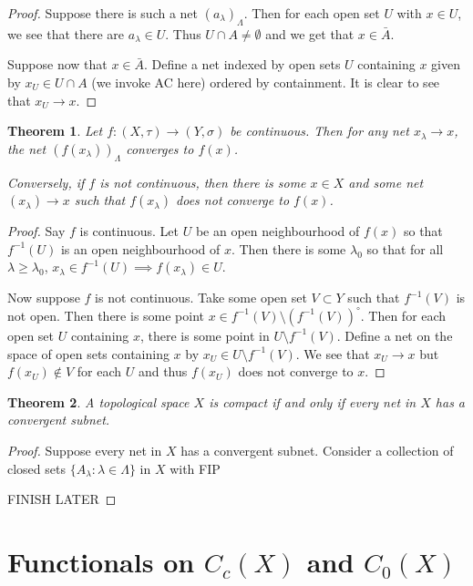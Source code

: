 \documentclass[11pt]{amsart}
\newtheorem{theorem}{Theorem}[section]
\theoremstyle{definition}
\numberwithin{equation}{section}
\begin{document}
\begin{proof}
    Suppose there is such a net $(a_\lambda)_\Lambda$. Then for each open set $U$ with $x\in U$, we see that there are $a_\lambda\in U$. Thus $U\cap A\ne\emptyset$ and we get that $x\in \bar A$.

    Suppose now that $x\in\bar A$. Define a net indexed by open sets $U$ containing $x$ given by $x_U\in U\cap A$ (we invoke AC here) ordered by containment. It is clear to see that $x_U\to x$.
\end{proof}
\begin{theorem}
    Let $f:(X,\tau)\to(Y,\sigma)$ be continuous. Then for any net $x_\lambda\to x$, the net $(f(x_\lambda))_\Lambda$ converges to $f(x)$.

    Conversely, if $f$ is not continuous, then there is some $x\in X$ and some net $(x_\lambda)\to x$ such that $f(x_\lambda)$ does not converge to $f(x)$.
\end{theorem}
\begin{proof}
    Say $f$ is continuous. Let $U$ be an open neighbourhood of $f(x)$ so that $f^{-1}(U)$ is an open neighbourhood of $x$. Then there is some $\lambda_0$ so that for all $\lambda\ge \lambda_0$, $x_\lambda\in f^{-1}(U)\implies f(x_\lambda)\in U$. 

    Now suppose $f$ is not continuous. Take some open set $V\subset Y$ such that $f^{-1}(V)$ is not open. Then there is some point $x\in f^{-1}(V)\setminus(f^{-1}(V))^\circ$. Then for each open set $U$ containing $x$, there is some point in $U\setminus f^{-1}(V)$. Define a net on the space of open sets containing $x$ by $x_U\in U\setminus f^{-1}(V)$. We see that $x_U\to x$ but $f(x_U)\not\in V$ for each $U$ and thus $f(x_U)$ does not converge to $x$.
\end{proof}
\begin{theorem}
    A topological space $X$ is compact if and only if every net in $X$ has a convergent subnet.
\end{theorem}
\begin{proof}
    Suppose every net in $X$ has a convergent subnet. Consider a collection of closed sets $\{A_\lambda:\lambda\in \Lambda\}$ in $X$ with FIP

    FINISH LATER
\end{proof}
\newpage
\section{Functionals on \texorpdfstring{$C_c(X)$}{Cc(X)} and \texorpdfstring{$C_0(X)$}{C0(X)}}
\end{document}
